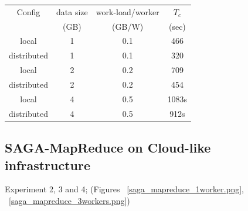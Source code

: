 \documentclass[conference,final]{IEEEtran}
\begin{document}
\begin{tabular}{cccc}
  \hline
  Config  &  data size   &   work-load/worker & $T_c$  \\
  &   (GB)  & (GB/W) & (sec) \\
  \hline
  local & 1 & 0.1 & 466 \\
  \hline
  distributed & 1 & 0.1 & 320 \\
  \hline \hline
  local & 2 & 0.2 & 709 \\
  \hline 
  distributed & 2 & 0.2 & 454 \\
  \hline \hline
local &  4 & 0.5 & 1083s\\
\hline
distributed &  4 &  0.5&  912s \\
\hline \hline
\end{tabular}





\subsection{SAGA-MapReduce on Cloud-like infrastructure}

Experiment 2, 3 and 4; 
(Figures ~\ref{saga_mapreduce_1worker.png}, ~\ref{saga_mapreduce_3workers.png})
\end{document}
